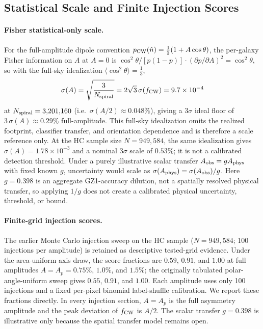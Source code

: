 \documentclass[twocolumn,linenumbers]{aastex702}
\begin{document}
\subsection{Statistical Scale and Finite Injection Scores}
\label{sec:sensitivity}

\paragraph{Fisher statistical-only scale.}
For the full-amplitude dipole convention $p_{\rm CW}(\hat n)=\tfrac12(1+A\cos\theta)$, the per-galaxy Fisher information on $A$ at $A=0$ is $\cos^2\theta/[p(1-p)] \cdot (\partial p/\partial A)^2 = \cos^2\theta$, so with the full-sky idealization $\langle\cos^2\theta\rangle=\tfrac13$,
\begin{equation}
\sigma(A) = \sqrt{\frac{3}{N_{\rm spiral}}} = 2\sqrt{3}\,\sigma(f_{\rm CW})
= 9.7\times10^{-4}
\label{eq:fisher_floor}
\end{equation}
at $N_{\rm spiral}=3{,}201{,}160$ (i.e.\ $\sigma(A/2)\approx0.048\%$), giving a $3\sigma$ ideal floor of $3\,\sigma(A)\approx0.29\%$ full-amplitude. This full-sky idealization omits the realized footprint, classifier transfer, and orientation dependence and is therefore a scale reference only. At the HC sample size $N=949{,}584$, the same idealization gives $\sigma(A)=1.78\times10^{-3}$ and a nominal $3\sigma$ scale of $0.53\%$; it is not a calibrated detection threshold. Under a purely illustrative scalar transfer $A_{\rm obs}=gA_{\rm phys}$ with fixed known $g$, uncertainty would scale as $\sigma(A_{\rm phys})=\sigma(A_{\rm obs})/g$. Here $g=0.398$ is an aggregate GZ1-accuracy dilution, not a spatially resolved physical transfer, so applying $1/g$ does not create a calibrated physical uncertainty, threshold, or bound.

\paragraph{Finite-grid injection scores.}
The earlier Monte Carlo injection sweep on the HC sample ($N=949{,}584$; 100 injections per amplitude) is retained as descriptive tested-grid evidence. Under the area-uniform axis draw, the score fractions are $0.59$, $0.91$, and $1.00$ at full amplitudes $A=A_p=0.75\%$, $1.0\%$, and $1.5\%$; the originally tabulated polar-angle-uniform sweep gives $0.55$, $0.91$, and $1.00$. Each amplitude uses only 100 injections and a fixed per-pixel binomial label-shuffle calibration. We report these fractions directly. In every injection section, $A=A_p$ is the full asymmetry amplitude and the peak deviation of $f_{\rm CW}$ is $A/2$. The scalar transfer $g=0.398$ is illustrative only because the spatial transfer model remains open.
\end{document}
